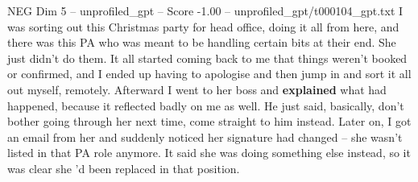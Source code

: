 \begin{textsample}{NEG Dim 5 – unprofiled\_gpt – Score -1.00 – unprofiled\_gpt/t000104\_gpt.txt}  \label{ex:f5_neg_018}
I was sorting out this Christmas party for head office, doing it all from here, and there was this PA who was meant to be handling certain bits at their end.
She just didn't do them.
It all started coming back to me that things weren't booked or confirmed, and I ended up having to apologise and then jump in and sort it all out myself, remotely.
Afterward I went to her boss and \textbf{explained} what had happened, because it reflected badly on me as well.
He just said, basically, don't bother going through her next time, come straight to him instead.
Later on, I got an email from her and suddenly noticed her signature had changed – she wasn't listed in that PA role anymore.
It said she was doing something else instead, so it was clear she ’d been replaced in that position.

\end{textsample}
